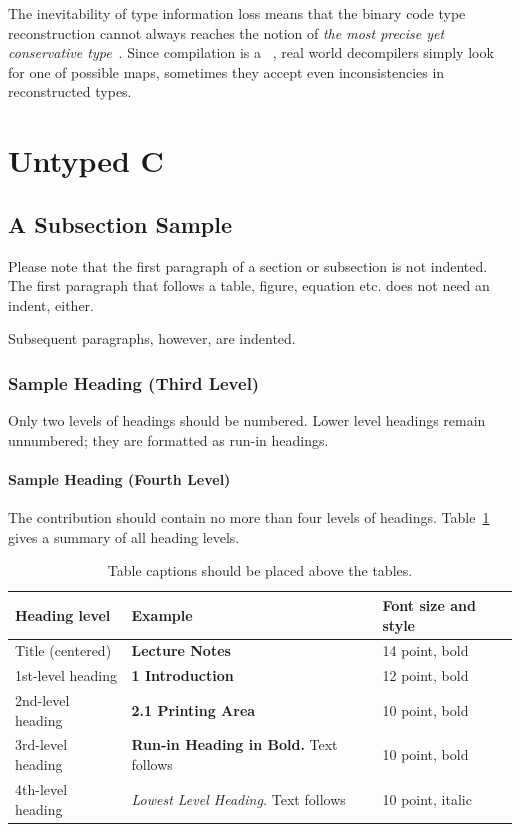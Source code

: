 \documentclass[a4paper]{llncs}
\begin{document}
The inevitability of type information loss means that the binary code
type reconstruction cannot always reaches the notion of
\emph{the most precise yet conservative type}~\cite{lee_tie_2011}. Since
compilation is a ~\cite{mycroft_type-based_1999},
real world decompilers simply look for one of possible maps,
sometimes they accept even inconsistencies in reconstructed types.

\section{Untyped C}




\subsection{A Subsection Sample}
Please note that the first paragraph of a section or subsection is
not indented. The first paragraph that follows a table, figure,
equation etc. does not need an indent, either.

Subsequent paragraphs, however, are indented.

\subsubsection{Sample Heading (Third Level)} Only two levels of
headings should be numbered. Lower level headings remain unnumbered;
they are formatted as run-in headings.

\paragraph{Sample Heading (Fourth Level)}
The contribution should contain no more than four levels of
headings. Table~\ref{tab1} gives a summary of all heading levels.

\begin{table}
\caption{Table captions should be placed above the
tables.}\label{tab1}
\begin{tabular}{|l|l|l|}
\hline
Heading level &  Example & Font size and style\\
\hline
Title (centered) &  {\Large\bfseries Lecture Notes} & 14 point, bold\\
1st-level heading &  {\large\bfseries 1 Introduction} & 12 point, bold\\
2nd-level heading & {\bfseries 2.1 Printing Area} & 10 point, bold\\
3rd-level heading & {\bfseries Run-in Heading in Bold.} Text follows & 10 point, bold\\
4th-level heading & {\itshape Lowest Level Heading.} Text follows & 10 point, italic\\
\hline
\end{tabular}
\end{table}
\end{document}
